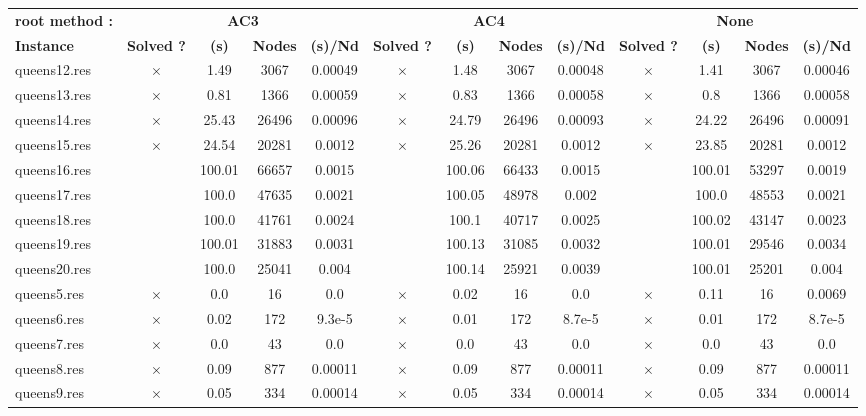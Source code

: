 \documentclass[main.tex]{subfiles}
\begin{document}
\begin{landscape}
\begin{center}
\renewcommand{\arraystretch}{1.4} 
\begin{tabular}{|l|cccc|cccc|cccc|}
	\hline
\textbf{root method :} & \multicolumn{4}{c}{\textbf{AC3}} & \multicolumn{4}{c}{\textbf{AC4}} & \multicolumn{4}{c}{\textbf{None}}\\
\textbf{Instance}  & \textbf{Solved ?} & \textbf{(s)} & \textbf{Nodes} & \textbf{(s)/Nd} & \textbf{Solved ?} & \textbf{(s)} & \textbf{Nodes} & \textbf{(s)/Nd} & \textbf{Solved ?} & \textbf{(s)} & \textbf{Nodes} & \textbf{(s)/Nd}\\\hline

queens12.res & $\times$ & 1.49 & 3067 & 0.00049
 & $\times$ & 1.48 & 3067 & 0.00048
 & $\times$ & 1.41 & 3067 & 0.00046
\\
queens13.res & $\times$ & 0.81 & 1366 & 0.00059
 & $\times$ & 0.83 & 1366 & 0.00058
 & $\times$ & 0.8 & 1366 & 0.00058
\\
queens14.res & $\times$ & 25.43 & 26496 & 0.00096
 & $\times$ & 24.79 & 26496 & 0.00093
 & $\times$ & 24.22 & 26496 & 0.00091
\\
queens15.res & $\times$ & 24.54 & 20281 & 0.0012
 & $\times$ & 25.26 & 20281 & 0.0012
 & $\times$ & 23.85 & 20281 & 0.0012
\\
queens16.res &  & 100.01 & 66657 & 0.0015
 &  & 100.06 & 66433 & 0.0015
 &  & 100.01 & 53297 & 0.0019
\\
queens17.res &  & 100.0 & 47635 & 0.0021
 &  & 100.05 & 48978 & 0.002
 &  & 100.0 & 48553 & 0.0021
\\
queens18.res &  & 100.0 & 41761 & 0.0024
 &  & 100.1 & 40717 & 0.0025
 &  & 100.02 & 43147 & 0.0023
\\
queens19.res &  & 100.01 & 31883 & 0.0031
 &  & 100.13 & 31085 & 0.0032
 &  & 100.01 & 29546 & 0.0034
\\
queens20.res &  & 100.0 & 25041 & 0.004
 &  & 100.14 & 25921 & 0.0039
 &  & 100.01 & 25201 & 0.004
\\
queens5.res & $\times$ & 0.0 & 16 & 0.0
 & $\times$ & 0.02 & 16 & 0.0
 & $\times$ & 0.11 & 16 & 0.0069
\\
queens6.res & $\times$ & 0.02 & 172 & 9.3e-5
 & $\times$ & 0.01 & 172 & 8.7e-5
 & $\times$ & 0.01 & 172 & 8.7e-5
\\
queens7.res & $\times$ & 0.0 & 43 & 0.0
 & $\times$ & 0.0 & 43 & 0.0
 & $\times$ & 0.0 & 43 & 0.0
\\
queens8.res & $\times$ & 0.09 & 877 & 0.00011
 & $\times$ & 0.09 & 877 & 0.00011
 & $\times$ & 0.09 & 877 & 0.00011
\\
queens9.res & $\times$ & 0.05 & 334 & 0.00014
 & $\times$ & 0.05 & 334 & 0.00014
 & $\times$ & 0.05 & 334 & 0.00014
\\
\hline\end{tabular}
\end{center}
\end{landscape}
\end{document}
